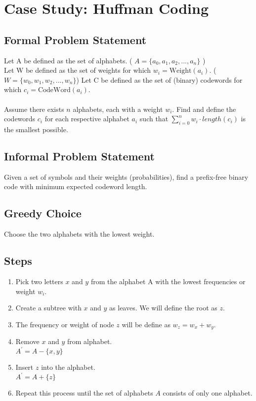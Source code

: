 \section{Case Study: Huffman Coding}

\subsection*{Formal Problem Statement}
Let A be defined as the set of alphabets. ( $A = \{ a_0, a_1, a_2, ..., a_n \}$ )\\
Let W be defined as the set of weights for which $w_i = \text{Weight}(a_i)$.  ($W = \{ w_0, w_1, w_2, ..., w_n \}$)
Let C be defined as the set of (binary) codewords for which $c_i = \text{CodeWord}(a_i)$.\\\\
Assume there exists $n$ alphabets, each with a weight $w_i$. Find and define the codewords $c_i$ for each respective alphabet $a_i$ such that $\sum\limits_{i=0}^{n} w_i \cdot length(c_i)$ is the smallest possible.

\subsection*{Informal Problem Statement}
Given a set of symbols and their weights (probabilities), find a prefix-free binary code with minimum expected codeword length.

\subsection*{Greedy Choice}
Choose the two alphabets with the lowest weight. 

\subsection*{Steps}
\begin{enumerate}
	\item Pick two letters $x$ and $y$ from the alphabet A with the lowest frequencies or weight $w_i$.
	\item Create a subtree with $x$ and $y$ as leaves. We will define the root as $z$.
	\item The frequency or weight of node $z$ will be define as $w_z = w_x + w_y$.
	\item Remove $x$ and $y$ from alphabet.\\
		$ A^\prime = A - \{ x, y \}$
	\item Insert $z$ into the alphabet.\\
		$ A^\prime = A + \{ z \} $
	\item Repeat this process until the set of alphabets $A$ consists of only one alphabet.
\end{enumerate}


